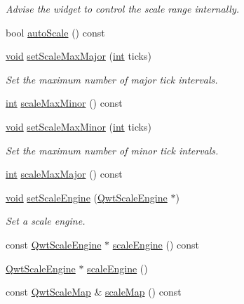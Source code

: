\begin{DoxyCompactItemize}
\begin{DoxyCompactList}\small\item\em Advise the widget to control the scale range internally. \end{DoxyCompactList}\item 
bool \hyperlink{class_qwt_abstract_scale_a01f1f43502a8ba14988a0bd3142d94b1}{auto\-Scale} () const 
\item 
\hyperlink{group___u_a_v_objects_plugin_ga444cf2ff3f0ecbe028adce838d373f5c}{void} \hyperlink{class_qwt_abstract_scale_a40fdb4572ad8fdec8b93766ff5f8eda8}{set\-Scale\-Max\-Major} (\hyperlink{ioapi_8h_a787fa3cf048117ba7123753c1e74fcd6}{int} ticks)
\begin{DoxyCompactList}\small\item\em Set the maximum number of major tick intervals. \end{DoxyCompactList}\item 
\hyperlink{ioapi_8h_a787fa3cf048117ba7123753c1e74fcd6}{int} \hyperlink{class_qwt_abstract_scale_a5b23fafbb56bb43fd241c1839256357f}{scale\-Max\-Minor} () const 
\item 
\hyperlink{group___u_a_v_objects_plugin_ga444cf2ff3f0ecbe028adce838d373f5c}{void} \hyperlink{class_qwt_abstract_scale_a6520bb1e52571f865b21b3710786a4db}{set\-Scale\-Max\-Minor} (\hyperlink{ioapi_8h_a787fa3cf048117ba7123753c1e74fcd6}{int} ticks)
\begin{DoxyCompactList}\small\item\em Set the maximum number of minor tick intervals. \end{DoxyCompactList}\item 
\hyperlink{ioapi_8h_a787fa3cf048117ba7123753c1e74fcd6}{int} \hyperlink{class_qwt_abstract_scale_a4cfbcd9880297b1ca28fa824e3f4c3e6}{scale\-Max\-Major} () const 
\item 
\hyperlink{group___u_a_v_objects_plugin_ga444cf2ff3f0ecbe028adce838d373f5c}{void} \hyperlink{class_qwt_abstract_scale_aa00f44140af3f2b7595cb6e23371198f}{set\-Scale\-Engine} (\hyperlink{class_qwt_scale_engine}{Qwt\-Scale\-Engine} $\ast$)
\begin{DoxyCompactList}\small\item\em Set a scale engine. \end{DoxyCompactList}\item 
const \hyperlink{class_qwt_scale_engine}{Qwt\-Scale\-Engine} $\ast$ \hyperlink{class_qwt_abstract_scale_a5b8084cc735933ce9338fd2df1126f0e}{scale\-Engine} () const 
\item 
\hyperlink{class_qwt_scale_engine}{Qwt\-Scale\-Engine} $\ast$ \hyperlink{class_qwt_abstract_scale_aea3b9d4912f1c28671f232e4100936d7}{scale\-Engine} ()
\item 
const \hyperlink{class_qwt_scale_map}{Qwt\-Scale\-Map} \& \hyperlink{class_qwt_abstract_scale_a68f120e12e373796b5d74199a9b8a4b0}{scale\-Map} () const 
\end{DoxyCompactItemize}

